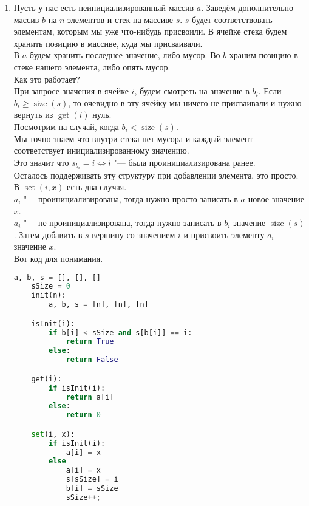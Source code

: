 \documentclass[a4paper, 10pt]{article}
\begin{document}
\begin{enumerate}
\item
\begin{enumerate}
	Пусть у нас есть неинициализированный массив $a$.
	Заведём дополнительно массив $b$ на $n$ элементов и стек на массиве $s$.
	$s$ будет соответствовать элементам, которым мы уже что-нибудь присвоили. В ячейке стека будем хранить позицию в массиве, куда мы присваивали.\\
	В $a$ будем хранить последнее значение, либо мусор. Во $b$ храним позицию в стеке нашего элемента, либо опять мусор.\\
	Как это работает?\\
	При запросе значения в ячейке $i$, будем смотреть на значение в $b_i$. Если $b_i \geq \operatorname{size}(s)$, то очевидно в эту ячейку мы ничего не присваивали и нужно вернуть из $\operatorname{get}(i)$ нуль.\\
	Посмотрим на случай, когда $b_i < \operatorname{size}(s)$.\\
	Мы точно знаем что внутри стека нет мусора и каждый элемент соответствует инициализированному значению.\\
	Это значит что $s_{b_i} = i \iff i$ "--- была проинициализирована ранее.\\
	Осталось поддерживать эту структуру при добавлении элемента, это просто.\\
	В $\operatorname{set}(i, x)$ есть два случая.\\
	$a_i$ "--- проинициализирована, тогда нужно просто записать в $a$ новое значение $x$.\\
	$a_i$ "--- не проинициализирована, тогда нужно записать в $b_i$ значение $\operatorname{size}(s)$.
	Затем добавить в $s$ вершину со значением $i$ и присвоить элементу $a_i$ значение $x$.\\
	\newpage
	Вот код для понимания.\\
	\begin{lstlisting}[language=Python]
	a, b, s = [], [], []
	sSize = 0
	init(n):
		a, b, s = [n], [n], [n]

	isInit(i):
		if b[i] < sSize and s[b[i]] == i:
			return True
		else:
			return False

	get(i):
		if isInit(i):
			return a[i]
		else:
			return 0

	set(i, x):
		if isInit(i):
			a[i] = x
		else
			a[i] = x
			s[sSize] = i
			b[i] = sSize
			sSize++;
	\end{lstlisting}
\end{enumerate}


\end{enumerate}
\end{document}

